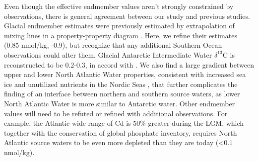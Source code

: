 \documentclass[agums]{aguplus}  %
\begin{document}

 Even though the effective endmember values aren't strongly constrained
 by observations, there is general agreement between our study and
 previous studies. Glacial endmember estimates were previously
 estimated by extrapolation of mixing lines in a property-property
 diagram \citep[AABW: 0.6 to 0.8 nmol/kg, -0.5 to -1.0\permil~
 $\delta^{13}$C,][]{Marchitto-Broecker-2006:Deep}. Here, we refine
 their estimates (0.85 nmol/kg, -0.9\permil), but recognize that any
 additional Southern Ocean observations could alter them.  Glacial
 Antarctic Intermediate Water $\delta^{13}$C is reconstructed to be
 0.2-0.3\permil, in accord with \citet{Curry-Oppo-2005:glacial}. We
 also find a large gradient between upper and lower North Atlantic
 Water properties, consistent with increased sea ice and unutilized
 nutrients in the Nordic Seas \citep{Mix-Fairbanks-1985:North}, that
 further complicates the finding of an interface between northern and
 southern source waters, as lower North Atlantic Water is more similar
 to Antarctic water.  Other endmember values will need to be refuted or
 refined with additional observations. For example, the Atlantic-wide
 range of Cd is 50\% greater during the LGM, which together with the
 conservation of global phosphate inventory, requires North Atlantic
 source waters to be even more depleted than they are today (<0.1
 nmol/kg).
\end{document}
